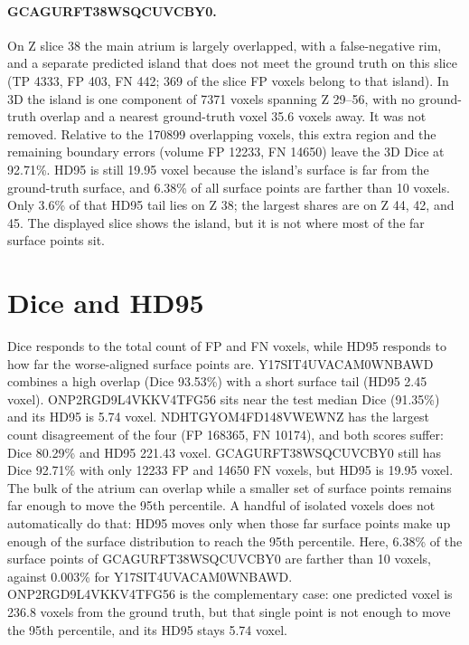 \documentclass{article}
\begin{document}
\paragraph{GCAGURFT38WSQCUVCBY0.}
On Z slice 38 the main atrium is largely overlapped, with a false-negative rim, and a separate predicted island that does not meet the ground truth on this slice (TP 4333, FP 403, FN 442; 369 of the slice FP voxels belong to that island). In 3D the island is one component of 7371 voxels spanning Z 29--56, with no ground-truth overlap and a nearest ground-truth voxel 35.6 voxels away. It was not removed. Relative to the 170899 overlapping voxels, this extra region and the remaining boundary errors (volume FP 12233, FN 14650) leave the 3D Dice at 92.71\%. HD95 is still 19.95 voxel because the island's surface is far from the ground-truth surface, and 6.38\% of all surface points are farther than 10 voxels. Only 3.6\% of that HD95 tail lies on Z 38; the largest shares are on Z 44, 42, and 45. The displayed slice shows the island, but it is not where most of the far surface points sit.

\section{Dice and HD95}
Dice responds to the total count of FP and FN voxels, while HD95 responds to how far the worse-aligned surface points are. Y17SIT4UVACAM0WNBAWD combines a high overlap (Dice 93.53\%) with a short surface tail (HD95 2.45 voxel). ONP2RGD9L4VKKV4TFG56 sits near the test median Dice (91.35\%) and its HD95 is 5.74 voxel. NDHTGYOM4FD148VWEWNZ has the largest count disagreement of the four (FP 168365, FN 10174), and both scores suffer: Dice 80.29\% and HD95 221.43 voxel. GCAGURFT38WSQCUVCBY0 still has Dice 92.71\% with only 12233 FP and 14650 FN voxels, but HD95 is 19.95 voxel. The bulk of the atrium can overlap while a smaller set of surface points remains far enough to move the 95th percentile. A handful of isolated voxels does not automatically do that: HD95 moves only when those far surface points make up enough of the surface distribution to reach the 95th percentile. Here, 6.38\% of the surface points of GCAGURFT38WSQCUVCBY0 are farther than 10 voxels, against 0.003\% for Y17SIT4UVACAM0WNBAWD. ONP2RGD9L4VKKV4TFG56 is the complementary case: one predicted voxel is 236.8 voxels from the ground truth, but that single point is not enough to move the 95th percentile, and its HD95 stays 5.74 voxel.
\end{document}
